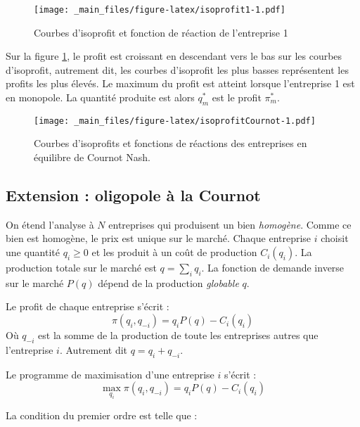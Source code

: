 \documentclass[
]{book}
\theoremstyle{definition}
\theoremstyle{definition}
\theoremstyle{definition}
\theoremstyle{definition}
\theoremstyle{remark}
\begin{document}
\begin{figure}
\centering
\texttt{[image: \_main\_files/figure-latex/isoprofit1-1.pdf]}
\caption{\label{fig:isoprofit1}Courbes d'isoprofit et fonction de réaction de l'entreprise 1}
\end{figure}

Sur la figure \ref{fig:isoprofit1}, le profit est croissant en descendant vers le bas sur les courbes d'isoprofit, autrement dit, les courbes d'isoprofit les plus basses représentent les profits les plus élevés.
Le maximum du profit est atteint lorsque l'entreprise 1 est en monopole.
La quantité produite est alors \(q_m^*\) est le profit \(\pi_m^*\).

\begin{figure}
\centering
\texttt{[image: \_main\_files/figure-latex/isoprofitCournot-1.pdf]}
\caption{\label{fig:isoprofitCournot}Courbes d'isoprofits et fonctions de réactions des entreprises en équilibre de Cournot Nash.}
\end{figure}

\hypertarget{extension-oligopole-uxe0-la-cournot}{%
\subsection{Extension : oligopole à la Cournot}\label{extension-oligopole-uxe0-la-cournot}}

On étend l'analyse à \(N\) entreprises qui produisent un bien \emph{homogène}.
Comme ce bien est homogène, le prix est unique sur le marché.
Chaque entreprise \(i\) choisit une quantité \(q_i\geq 0\) et les produit à un coût de production \(C_i(q_i)\).
La production totale sur le marché est \(q=\sum_i q_i\).
La fonction de demande inverse sur le marché \(P(q)\) dépend de la production \emph{globable} \(q\).

Le profit de chaque entreprise s'écrit :
\[
\pi(q_i, q_{-i}) = q_iP(q) -C_i(q_i)
\]
Où \(q_{-i}\) est la somme de la production de toute les entreprises autres que l'entreprise \(i\).
Autrement dit \(q=q_i+q_{-i}\).

Le programme de maximisation d'une entreprise \(i\) s'écrit :
\[
\max_{q_i}\pi(q_i, q_{-i}) = q_iP(q) -C_i(q_i)
\]

La condition du premier ordre est telle que :
\end{document}
